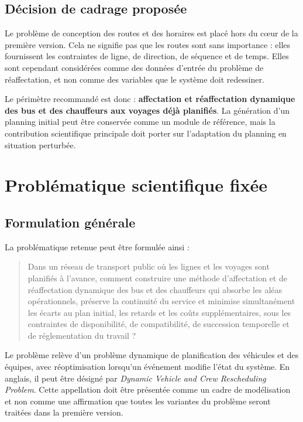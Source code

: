 \documentclass[12pt,a4paper]{article}
\begin{document}
\subsection{Décision de cadrage proposée}

Le problème de conception des routes et des horaires est placé hors du cœur de la première version. Cela ne signifie pas que les routes sont sans importance : elles fournissent les contraintes de ligne, de direction, de séquence et de temps. Elles sont cependant considérées comme des données d’entrée du problème de réaffectation, et non comme des variables que le système doit redessiner.

Le périmètre recommandé est donc : \textbf{affectation et réaffectation dynamique des bus et des chauffeurs aux voyages déjà planifiés}. La génération d’un planning initial peut être conservée comme un module de référence, mais la contribution scientifique principale doit porter sur l’adaptation du planning en situation perturbée.

\section{Problématique scientifique fixée}

\subsection{Formulation générale}

La problématique retenue peut être formulée ainsi :

\begin{quote}
Dans un réseau de transport public où les lignes et les voyages sont planifiés à l’avance, comment construire une méthode d’affectation et de réaffectation dynamique des bus et des chauffeurs qui absorbe les aléas opérationnels, préserve la continuité du service et minimise simultanément les écarts au plan initial, les retards et les coûts supplémentaires, sous les contraintes de disponibilité, de compatibilité, de succession temporelle et de réglementation du travail ?
\end{quote}

Le problème relève d’un problème dynamique de planification des véhicules et des équipes, avec réoptimisation lorsqu’un événement modifie l’état du système. En anglais, il peut être désigné par \emph{Dynamic Vehicle and Crew Rescheduling Problem}. Cette appellation doit être présentée comme un cadre de modélisation et non comme une affirmation que toutes les variantes du problème seront traitées dans la première version.
\end{document}
